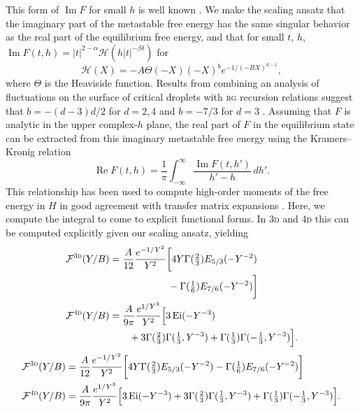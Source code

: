\documentclass[aps,prl,preprint]{revtex4-1}
\def\[{\begin{equation}}
\def\]{\end{equation}}
\def\ei{\mathop{\mathrm{Ei}}\nolimits} %
\def\re{\mathop{\mathrm{Re}}\nolimits}
\def\im{\mathop{\mathrm{Im}}\nolimits}
\def\dd{d} %
\def\fF{\mathcal F}  %
\def\fiF{\mathcal H} %
\def\dim{d}
\def\threedee{\textsc{3d} }
\def\fourdee{\textsc{4d} }
\newif\ifreprint
\begin{document}
This form of $\im F$ for small $h$ is well known
\cite{langer.1967.condensation,harris.1984.metastability}.  We make the scaling
ansatz that the imaginary part of the metastable free energy has the same
singular behavior as the real part of the equilibrium free energy, and that for
small $t$, $h$, $\im F(t,h)=|t|^{2-\alpha}\fiF(h|t|^{-\beta\delta})$ for
\[
  \fiF(X)=-A\Theta(-X)(-X)^be^{-1/(-BX)^{\dim-1}},
  \label{eq:im.scaling}
\]
where $\Theta$ is the Heaviside function. Results from combining an analysis
of fluctuations on the surface of critical droplets with \textsc{rg} recursion
relations suggest that $b=-(d-3)d/2$ for $d=2,4$ and $b=-7/3$ for
$d=3$
\cite{houghton.1980.metastable,rudnick.1976.equations,gunther.1980.goldstone}.
Assuming that $F$ is analytic in the upper complex-$h$ plane, the real part of
$F$ in the equilibrium state can be extracted from this imaginary metastable
free energy using the Kramers--Kronig relation
\[
  \re F(t,h)=\frac1\pi\int_{-\infty}^\infty\frac{\im F(t,h')}{h'-h}\,\dd h'.
\]
This relationship has been used to compute high-order moments of the free
energy in $H$ in good agreement with transfer matrix expansions
\cite{lowe.1980.instantons}. Here, we compute the integral to come to explicit
functional forms.  In \threedee and \fourdee this can be computed
explicitly given our scaling ansatz, yielding
\def\eqthreedeeone{
  \fF^\threedee(Y/B)&=
  \frac{A}{12}\frac{e^{-1/Y^2}}{Y^2}
  \bigg[4Y\Gamma(\tfrac23)E_{5/3}(-Y^{-2})
}
\def\eqthreedeetwo{
  -\Gamma(\tfrac16)E_{7/6}(-Y^{-2})\bigg]
}
\def\eqfourdeeone{
  \fF^\fourdee(Y/B)&=
  \frac{A}{9\pi}\frac{e^{1/Y^3}}{Y^2}
  \Big[3\ei(-Y^{-3})
}
\def\eqfourdeetwo{
  +3\Gamma(\tfrac23)\Gamma(\tfrac13,Y^{-3})
  +\Gamma(\tfrac13)\Gamma(-\tfrac13,Y^{-3})\Big]
}
\ifreprint
\begin{align}
  &\begin{aligned}
    \eqthreedeeone\\
    &\hspace{6em}
    \eqthreedeetwo
  \end{aligned}
  \\
  &\begin{aligned}
    \eqfourdeeone
    \\
    &\hspace{2em}
    \eqfourdeetwo.
  \end{aligned}
\end{align}
\else
\begin{align}
  \eqthreedeeone\eqthreedeetwo
  \\
  \eqfourdeeone\eqfourdeetwo.
\end{align}
\end{document}
